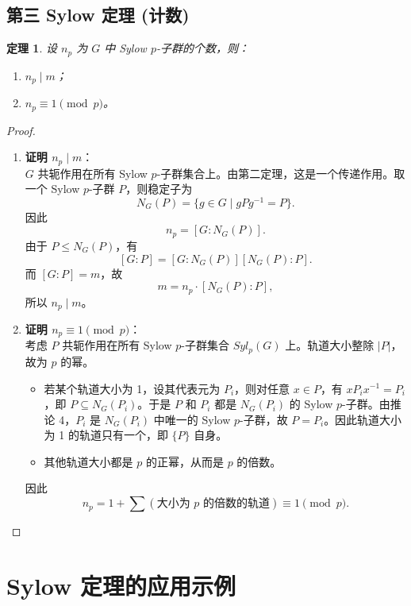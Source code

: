 \documentclass[11pt,a4paper]{ctexart}
\newtheorem*{theorem}{定理}
\theoremstyle{remark}
\begin{document}
\subsection*{第三 Sylow 定理 (计数)}
\begin{theorem}
设 \(n_p\) 为 \(G\) 中 Sylow \(p\)-子群的个数，则：
\begin{enumerate}
    \item \(n_p \mid m\)；
    \item \(n_p \equiv 1 \pmod p\)。
\end{enumerate}
\end{theorem}
\begin{proof}
\begin{enumerate}
    \item \textbf{证明 \(n_p \mid m\)}：\\
    \(G\) 共轭作用在所有 Sylow \(p\)-子群集合上。由第二定理，这是一个传递作用。取一个 Sylow \(p\)-子群 \(P\)，则稳定子为
    \[
    N_G(P)=\{g\in G\mid gPg^{-1}=P\}.
    \]
    因此
    \[
    n_p = [G : N_G(P)].
    \]
    由于 \(P \le N_G(P)\)，有
    \[
    [G:P] = [G:N_G(P)][N_G(P):P].
    \]
    而 \([G:P]=m\)，故
    \[
    m = n_p \cdot [N_G(P):P],
    \]
    所以 \(n_p \mid m\)。
    
    \item \textbf{证明 \(n_p \equiv 1 \pmod p\)}：\\
    考虑 \(P\) 共轭作用在所有 Sylow \(p\)-子群集合 \(Syl_p(G)\) 上。轨道大小整除 \(|P|\)，故为 \(p\) 的幂。
    \begin{itemize}
        \item 若某个轨道大小为 1，设其代表元为 \(P_i\)，则对任意 \(x\in P\)，有 \(xP_ix^{-1}=P_i\)，即 \(P\subseteq N_G(P_i)\)。于是 \(P\) 和 \(P_i\) 都是 \(N_G(P_i)\) 的 Sylow \(p\)-子群。由推论 4，\(P_i\) 是 \(N_G(P_i)\) 中唯一的 Sylow \(p\)-子群，故 \(P=P_i\)。因此轨道大小为 1 的轨道只有一个，即 \(\{P\}\) 自身。
        \item 其他轨道大小都是 \(p\) 的正幂，从而是 \(p\) 的倍数。
    \end{itemize}
    因此
    \[
    n_p = 1 + \sum (\text{大小为 } p \text{ 的倍数的轨道}) \equiv 1 \pmod p.
    \]
\end{enumerate}
\end{proof}

\section*{Sylow 定理的应用示例}
\end{document}
